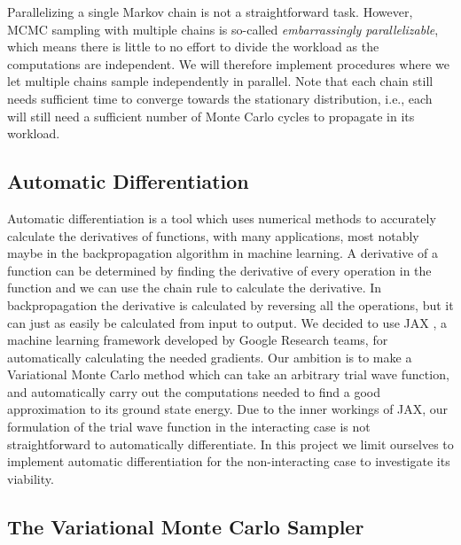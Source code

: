 Parallelizing a single Markov chain is not a straightforward task. However, MCMC sampling with multiple chains is so-called \textit{embarrassingly parallelizable}, which means there is little to no effort to divide the workload as the computations are independent. We will therefore implement procedures where we let multiple chains sample independently in parallel. Note that each chain still needs sufficient time to converge towards the stationary distribution, i.e., each will still need a sufficient number of Monte Carlo cycles to propagate in its workload. 

\subsection{Automatic Differentiation}

Automatic differentiation is a tool which uses numerical methods to accurately calculate the derivatives of functions, with many applications, most notably maybe in the backpropagation algorithm in machine learning. A derivative of a function can be determined by finding the derivative of every operation in the function and we can use the chain rule to calculate the derivative. In backpropagation the derivative is calculated by reversing all the operations, but it can just as easily be calculated from input to output.
We decided to use JAX \citep{jax2018github}, a machine learning framework developed by Google Research teams, for automatically calculating the needed gradients. Our ambition is to make a Variational Monte Carlo method which can take an arbitrary trial wave function, and automatically carry out the computations needed to find a good approximation to its ground state energy. Due to the inner workings of JAX, our formulation of the trial wave function in the interacting case is not straightforward to automatically differentiate. 
In this project we limit ourselves to implement automatic differentiation for the non-interacting case to investigate its viability. 

\subsection{The Variational Monte Carlo Sampler}\label{seq:vmc_framework}

